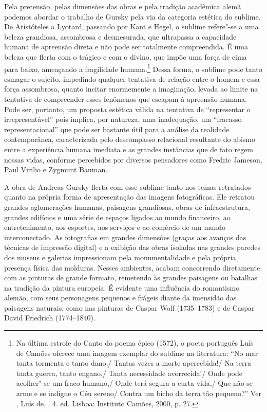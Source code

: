 Pela pretensão, pelas dimensões das obras e pela tradição acadêmica
alemã podemos abordar o trabalho de Gursky pela via da categoria
estética do sublime. De Aristóteles a Lyotard, passando por Kant e
Hegel, o sublime refere"-se a uma beleza grandiosa, assombrosa e
desmesurada, que ultrapassa a capacidade humana de apreensão direta e
não pode ser totalmente compreendida. É uma beleza que flerta com o
trágico e com o divino, que impõe uma força de cima para baixo,
ameaçando a fragilidade humana.\footnote{Na última estrofe do Canto  do
  poema épico {} (1572), o poeta português Luís de Camões
  oferece uma imagem exemplar do sublime na literatura: ``No mar tanta
  tormenta e tanto dano,/ Tantas vezes a morte apercebida!/ Na terra
  tanta guerra, tanto engano,/ Tanta necessidade avorrecida!/ Onde pode
  acolher"-se um fraco humano,/ Onde terá segura a curta vida,/ Que não
  se arme e se indigne o Céu sereno/ Contra um bicho da terra tão
  pequeno?'' Ver , Luís de. {}. 4. ed. Lisboa: Instituto
  Camões, 2000, p. 27.} Dessa forma, o sublime pode tanto
esmagar o sujeito, impedindo qualquer tentativa de relação entre o homem
e essa força assombrosa, quanto incitar enormemente a imaginação, levada
ao limite na tentativa de compreender esses fenômenos que escapam à
apreensão humana. Pode ser, portanto, um proposta estética válida na
tentativa de ``representar o irrepresentável'' pois implica, por
natureza, uma inadequação, um ``fracasso representacional'' que pode ser
bastante útil para a análise da realidade contemporânea, caracterizada
pelo descompasso relacional resultante do abismo entre a experiência
humana imediata e as grandes instâncias que de fato regem nossas vidas,
conforme percebidos por diversos pensadores como Fredric Jameson, Paul Virilio e Zygmunt Bauman.

A obra de Andreas Gursky flerta com esse sublime tanto nos temas
retratados quanto na própria forma de apresentação das imagens
fotográficas. Ele retratou grandes aglomerações humanas, paisagens
grandiosas, obras de infraestrutura, grandes edifícios e uma série de
espaços ligados ao mundo financeiro, ao entretenimento, aos esportes,
aos serviços e ao comércio de um mundo interconectado. As fotografias em
grandes dimensões (graças aos avanços das técnicas de impressão digital)
e a exibição das obras isoladas nas grandes paredes dos museus e
galerias impressionam pela monumentalidade e pela própria presença
física das molduras. Nesses ambientes, acabam concorrendo diretamente
com as pinturas de grande formato, remetendo às grandes paisagens ou
batalhas na tradição da pintura europeia. É evidente uma influência do
romantismo alemão, com seus personagens pequenos e frágeis diante da
imensidão das paisagens naturais, como nas pinturas de Caspar Wolf
(1735--1783) e de Caspar David Friedrich (1774--1840).

